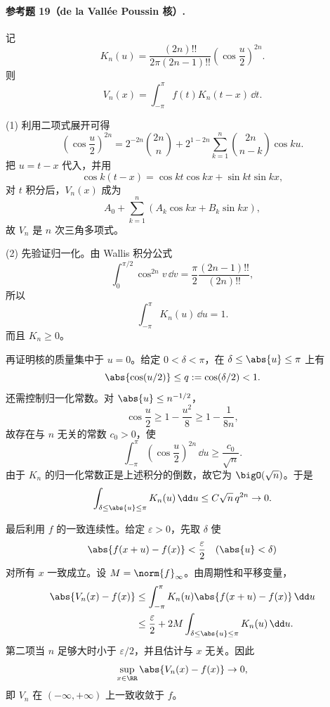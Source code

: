 \paragraph{参考题 19（de la Vallée Poussin 核）.}
\begin{xsolution}
记
\[
  K_n(u)=\frac{(2n)!!}{2\pi(2n-1)!!}
  \left(\cos\frac u2\right)^{2n}.
\]
则
\[
  V_n(x)=\int_{-\pi}^{\pi}f(t)K_n(t-x)\,\dd t.
\]

(1) 利用二项式展开可得
\[
  \left(\cos\frac u2\right)^{2n}
  =2^{-2n}\binom{2n}{n}
  +2^{1-2n}\sum_{k=1}^{n}\binom{2n}{n-k}\cos ku.
\]
把 $u=t-x$ 代入，并用
\[
  \cos k(t-x)=\cos kt\cos kx+\sin kt\sin kx,
\]
对 $t$ 积分后，$V_n(x)$ 成为
\[
  A_0+\sum_{k=1}^{n}(A_k\cos kx+B_k\sin kx),
\]
故 $V_n$ 是 $n$ 次三角多项式。

(2) 先验证归一化。由 Wallis 积分公式
\[
  \int_0^{\pi/2}\cos^{2n}v\,\dd v
  =\frac\pi2\frac{(2n-1)!!}{(2n)!!},
\]
所以
\[
  \int_{-\pi}^{\pi}K_n(u)\,\dd u=1.
\]
而且 $K_n\ge0$。

再证明核的质量集中于 $u=0$。给定 $0<\delta<\pi$，在
$\delta\le\abs{u}\le\pi$ 上有
\[
  \abs{\cos(u/2)}\le q:=\cos(\delta/2)<1.
\]
还需控制归一化常数。对 $\abs{u}\le n^{-1/2}$，
\[
  \cos\frac u2\ge1-\frac{u^2}{8}\ge1-\frac1{8n},
\]
故存在与 $n$ 无关的常数 $c_0>0$，使
\[
  \int_{-\pi}^{\pi}\left(\cos\frac u2\right)^{2n}\,\dd u
  \ge\frac{c_0}{\sqrt n}.
\]
由于 $K_n$ 的归一化常数正是上述积分的倒数，故它为 $\bigO(\sqrt n)$。于是
\[
  \int_{\delta\le\abs{u}\le\pi}K_n(u)\,\dd u
  \le C\sqrt n\,q^{2n}\to0.
\]

最后利用 $f$ 的一致连续性。给定 $\varepsilon>0$，先取 $\delta$ 使
\[
  \abs{f(x+u)-f(x)}<\frac\varepsilon2
  \quad(\abs{u}<\delta)
\]
对所有 $x$ 一致成立。设 $M=\norm{f}_\infty$。由周期性和平移变量，
\begin{align*}
  \abs{V_n(x)-f(x)}
  &\le\int_{-\pi}^{\pi}K_n(u)
  \abs{f(x+u)-f(x)}\,\dd u\\
  &\le\frac\varepsilon2
  +2M\int_{\delta\le\abs{u}\le\pi}K_n(u)\,\dd u.
\end{align*}
第二项当 $n$ 足够大时小于 $\varepsilon/2$，并且估计与 $x$ 无关。因此
\[
  \sup_{x\in\RR}\abs{V_n(x)-f(x)}\to0,
\]
即 $V_n$ 在 $(-\infty,+\infty)$ 上一致收敛于 $f$。
\end{xsolution}

